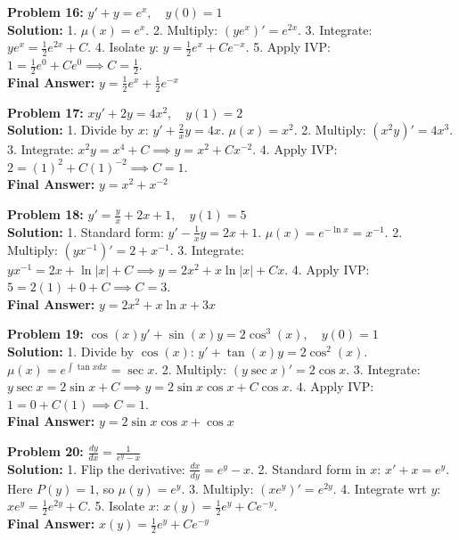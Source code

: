 \documentclass[11pt]{article}
\begin{document}
\vspace{10pt}
\textbf{Problem 16:} $y' + y = e^x, \quad y(0) = 1$ \\
\textbf{Solution:} 
1. $\mu(x) = e^x$. 
2. Multiply: $(ye^x)' = e^{2x}$. 
3. Integrate: $ye^x = \frac{1}{2}e^{2x} + C$. 
4. Isolate $y$: $y = \frac{1}{2}e^x + Ce^{-x}$. 
5. Apply IVP: $1 = \frac{1}{2}e^0 + C e^0 \implies C = \frac{1}{2}$. \\
\textbf{Final Answer:} $y = \frac{1}{2}e^x + \frac{1}{2}e^{-x}$

\vspace{10pt}
\textbf{Problem 17:} $x y' + 2y = 4x^2, \quad y(1) = 2$ \\
\textbf{Solution:} 
1. Divide by $x$: $y' + \frac{2}{x}y = 4x$. $\mu(x) = x^2$. 
2. Multiply: $(x^2 y)' = 4x^3$. 
3. Integrate: $x^2 y = x^4 + C \implies y = x^2 + Cx^{-2}$. 
4. Apply IVP: $2 = (1)^2 + C(1)^{-2} \implies C = 1$. \\
\textbf{Final Answer:} $y = x^2 + x^{-2}$

\vspace{10pt}
\textbf{Problem 18:} $y' = \frac{y}{x} + 2x + 1, \quad y(1) = 5$ \\
\textbf{Solution:} 
1. Standard form: $y' - \frac{1}{x}y = 2x + 1$. $\mu(x) = e^{-\ln x} = x^{-1}$. 
2. Multiply: $(yx^{-1})' = 2 + x^{-1}$. 
3. Integrate: $yx^{-1} = 2x + \ln|x| + C \implies y = 2x^2 + x\ln|x| + Cx$. 
4. Apply IVP: $5 = 2(1) + 0 + C \implies C = 3$. \\
\textbf{Final Answer:} $y = 2x^2 + x\ln x + 3x$

\vspace{10pt}
\textbf{Problem 19:} $\cos(x) y' + \sin(x)y = 2\cos^3(x), \quad y(0) = 1$ \\
\textbf{Solution:} 
1. Divide by $\cos(x)$: $y' + \tan(x)y = 2\cos^2(x)$. $\mu(x) = e^{\int \tan x dx} = \sec x$. 
2. Multiply: $(y \sec x)' = 2\cos x$. 
3. Integrate: $y \sec x = 2\sin x + C \implies y = 2\sin x \cos x + C\cos x$. 
4. Apply IVP: $1 = 0 + C(1) \implies C = 1$. \\
\textbf{Final Answer:} $y = 2\sin x \cos x + \cos x$

\vspace{10pt}
\textbf{Problem 20:} $\frac{dy}{dx} = \frac{1}{e^y - x}$ \\
\textbf{Solution:} 
1. Flip the derivative: $\frac{dx}{dy} = e^y - x$. 
2. Standard form in $x$: $x' + x = e^y$. Here $P(y) = 1$, so $\mu(y) = e^y$. 
3. Multiply: $(x e^y)' = e^{2y}$. 
4. Integrate wrt $y$: $x e^y = \frac{1}{2}e^{2y} + C$. 
5. Isolate $x$: $x(y) = \frac{1}{2}e^y + Ce^{-y}$. \\
\textbf{Final Answer:} $x(y) = \frac{1}{2}e^y + Ce^{-y}$
\end{document}
